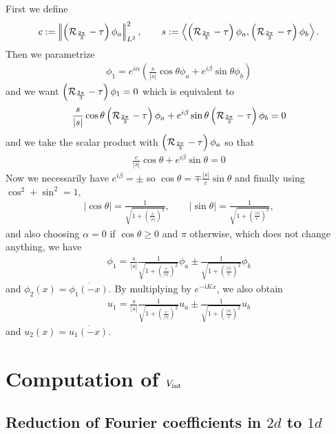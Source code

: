 \documentclass[11pt,a4paper,reqno,french,tikz]{amsart}
\renewcommand{\ge}{\geqslant}\renewcommand{\le}{\leqslant}
\newcommand{\pa}[1]{\left( #1 \right)} %
\newcommand{\ab}[1]{\left|#1\right|} %
\newcommand{\ps}[1]{\left< #1 \right>} %
\newcommand{\nor}[2]{ \left| \! \left| #1 \right| \! \right|_{#2} } %
\newcommand{\f}[2]{\frac{#1}{#2}} %
\newcommand{\ind}[1]{_{\textup{#1}}} %
\begin{document}
First we define
\begin{align*}
c := \nor{\pa{\cR_{\f{2\pi}{3}} -\tau}\phi_a}{L^2}^2, \qquad s := \ps{\pa{\cR_{\f{2\pi}{3}} -\tau}\phi_a,\pa{\cR_{\f{2\pi}{3}} -\tau}\phi_b}.
\end{align*}
Then we parametrize
\begin{align*}
\phi_1 = e^{i \alpha} \pa{\f s{\ab{s}} \cos \theta \phi_a + e^{i\beta} \sin \theta \phi_b}
\end{align*}
and we want $\pa{\cR_{\f{2\pi}{3}} -\tau}\phi_1 = 0$ which is equivalent to
\begin{align*}
\f s{\ab{s}}\cos \theta \pa{\cR_{\f{2\pi}{3}} -\tau}\phi_a + e^{i\beta} \sin \theta \pa{\cR_{\f{2\pi}{3}} -\tau}\phi_b =0
\end{align*}
and we take the scalar product with $\pa{\cR_{\f{2\pi}{3}} -\tau}\phi_a$ so that
\begin{align*}
\f c{\ab{s}}\cos \theta  + e^{i\beta} \sin \theta =0
\end{align*}
Now we necessarily have $e^{i\beta} = \pm$ so $\cos \theta = \mp \f {\ab{s}}c \sin \theta$ and finally using $\cos^2 + \sin^2 = 1$,
\begin{align*}
\ab{\cos \theta} = \f 1{\sqrt{1+ \pa{\f c{\ab{s}}}^2}}, \qquad \ab{\sin \theta} = \f 1{\sqrt{1+ \pa{\f {\ab{s}}c}^2}},
\end{align*}
and also choosing $\alpha = 0$ if $\cos \theta \ge 0$ and $\pi$ otherwise, which does not change anything, we have
\begin{align*}
\phi_1 = \f{s}{\ab{s}}\f 1{\sqrt{1+ \pa{\f c{\ab{s}}}^2}} \phi_a \pm \f 1{\sqrt{1+ \pa{\f {\ab{s}}c}^2}} \phi_b
\end{align*}
and $\phi_2(x) = \overline{\phi_1(-x)}$. By multiplying by $e^{-iKx}$, we also obtain
\begin{align*}
\boxed{u_1 = \f{s}{\ab{s}}\f 1{\sqrt{1+ \pa{\f c{\ab{s}}}^2}} u_a \pm \f 1{\sqrt{1+ \pa{\f {\ab{s}}c}^2}} u_b}
\end{align*}
and $u_2(x) = \overline{u_1(-x)}$.





\section{Computation of $V\ind{int}$}%
\label{sec:computation_of_vint_}

\subsection{Reduction of Fourier coefficients in $2d$ to $1d$}%
\label{sub:reduction_of_fourier_coefficients_in_2d_to_1d_}
\end{document}
